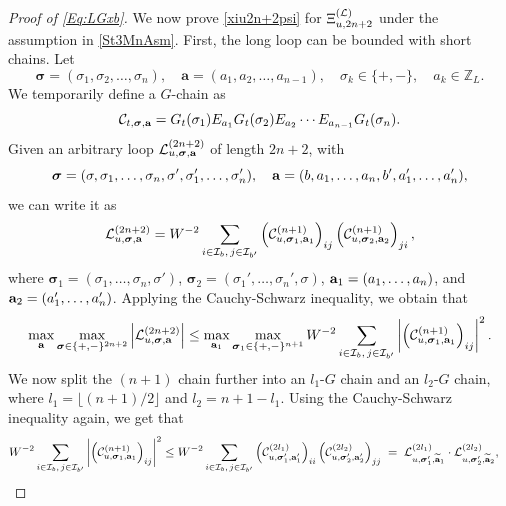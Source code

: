 \documentclass[10pt,reqno]{article}
\newcommand{\wt}{\widetilde}
\newcommand{\ba}{{\bf{a}}}
\theoremstyle{plain} %
\theoremstyle{remark}
\numberwithin{equation}{section}
\begin{document}
\begin{proof}[Proof of \eqref{Eq:LGxb}]
We now  prove \eqref{xiu2n+2psi} for $\Xi^{(\cal L)}_{u, {2n+2}}$ under the assumption in \eqref{St3MnAsm}.  First, the long loop can be bounded with  short chains.  Let 
\[
\boldsymbol{\sigma} = (\sigma_1, \sigma_2, \ldots, \sigma_n), \quad \textbf{a} = (a_1, a_2, \ldots, a_{n-1}), \quad \sigma_k \in \{+, -\}, \quad a_k \in \mathbb{Z}_L.
\]
We temporarily define a $G$-chain as
\begin{equation}\label{defC=GEG}
    {\cal C}_{t, \boldsymbol{\sigma}, \textbf{a}} = G_t(\sigma_1) E_{a_1} G_t(\sigma_2) E_{a_2} \cdots E_{a_{n-1}} G_t(\sigma_n).
\end{equation}
Given an arbitrary loop ${\cal L}^{(2n+2)}_{u,\boldsymbol{\sigma},\ba}$ of length $2n+2$, with
$$\boldsymbol{\sigma}=(\sigma, \sigma_1,\ldots, \sigma_n, \sigma',\sigma_1',\ldots, \sigma_n'),\quad \ba=(b, a_1 ,\ldots, a_n , b'  , a_1' ,\ldots, a_n' ),$$ 
we can write it as 
\begin{align*}
{\cal L}^{(2n+2)}_{u,\boldsymbol{\sigma},\ba}=W^{-2}\sum_{i\in{\cal I}_b,\,j\in{\cal I}_{b'}} \left({\cal C}^{(n+1)}_{u,\boldsymbol{\sigma}_1,\ba_1}\right)_{ij} \left({\cal C}^{(n+1)}_{u,\boldsymbol{\sigma}_2,\ba_2}\right)_{ji} ,  
\end{align*}
where $\boldsymbol{\sigma}_1=(\sigma_1,\ldots, \sigma_n, \sigma')$, $\boldsymbol{\sigma}_2=(\sigma_1',\ldots, \sigma_n',\sigma)$, $\ba_1=(a_1,\ldots, a_n )$, and $\ba_2=( a_1' ,\ldots, a_n' )$. Applying the Cauchy-Schwarz inequality, we obtain that 
\begin{equation}\label{suauwiioo1}
\max_{\ba }\max_{\boldsymbol{\sigma}\in \{+,-\}^{2n+2}}\left|{\cal L}^{(2n+2)}_{u,\boldsymbol{\sigma},\ba}\right|
\le 
\max_{\ba_1}\max_{\boldsymbol{\sigma}_1 \in\{+,-\}^{n+1}} W^{-2 }\sum_{i\in{\cal I}_b,\,j\in{\cal I}_{b'}}
\left|\left({\cal C}^{(n+1)} _{u,\boldsymbol{\sigma}_1,\ba_1}\right)_{ij} 
\right|^2 .
\end{equation}
We now split the $(n+1)$ chain further into an $l_1$-$G$ chain and an $l_2$-$G$ chain, where $l_1=\lfloor(n+1)/{2}\rfloor$ and $l_2=n+1-l_1$. 
Using the Cauchy-Schwarz inequality again, we get that  \begin{align}\label{suauwiioo2}
    W^{-2 }\sum_{i\in{\cal I}_b,\,j\in{\cal I}_{b'}}
\left|\left({\cal C}^{(n+1)} _{u,\boldsymbol{\sigma}_1,\ba_1}\right)_{ij} 
\right|^2 &\le W^{-2 }\sum_{i\in{\cal I}_b,\,j\in{\cal I}_{b'}} \left({\cal C}^{(2l_1)}_{u,\boldsymbol{\sigma}_1',\ba_1'}\right)_{ii} \left({\cal C}^{(2l_2)}_{u,\boldsymbol{\sigma}_2',\ba_2'}\right)_{jj}  \;=\; {\cal L}^{(2l_1)}_{u,\boldsymbol{\sigma}_1',\wt\ba_1}\cdot {\cal L}^{(2l_2)}_{u,\boldsymbol{\sigma}_2',\wt\ba_2},

\end{align}
\end{proof}
\end{document}
